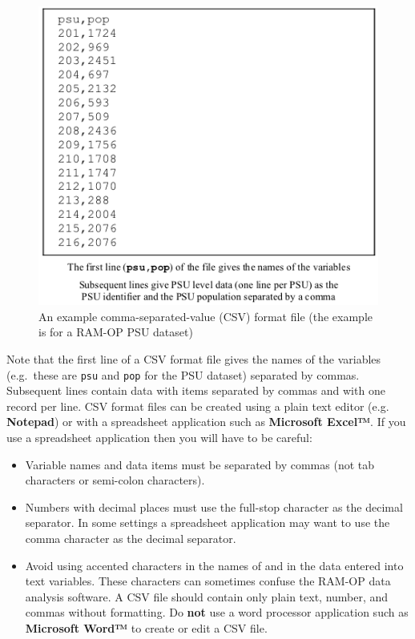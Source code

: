 \documentclass[12pt,a4paper]{book}
\theoremstyle{definition}
\theoremstyle{definition}
\theoremstyle{definition}
\theoremstyle{remark}
\begin{document}
\begin{figure}[H]

{\centering \includegraphics[width=800pt]{figures/dataset02} 

}

\caption{An example comma-separated-value (CSV) format file (the example is for a RAM-OP PSU dataset)}\label{fig:dataset02}
\end{figure}

Note that the first line of a CSV format file gives the names of the
variables (e.g.~these are \texttt{psu} and \texttt{pop} for the PSU
dataset) separated by commas. Subsequent lines contain data with items
separated by commas and with one record per line. CSV format files can
be created using a plain text editor (e.g. \textbf{Notepad}) or with a
spreadsheet application such as \textbf{Microsoft Excel™}. If you use a
spreadsheet application then you will have to be careful:

\begin{itemize}
\item
  Variable names and data items must be separated by commas (not tab
  characters or semi-colon characters).
\item
  Numbers with decimal places must use the full-stop character as the
  decimal separator. In some settings a spreadsheet application may want
  to use the comma character as the decimal separator.
\item
  Avoid using accented characters in the names of and in the data
  entered into text variables. These characters can sometimes confuse
  the RAM-OP data analysis software. A CSV file should contain only
  plain text, number, and commas without formatting. Do \textbf{not} use
  a word processor application such as \textbf{Microsoft Word™} to
  create or edit a CSV file.
\end{itemize}
\end{document}
